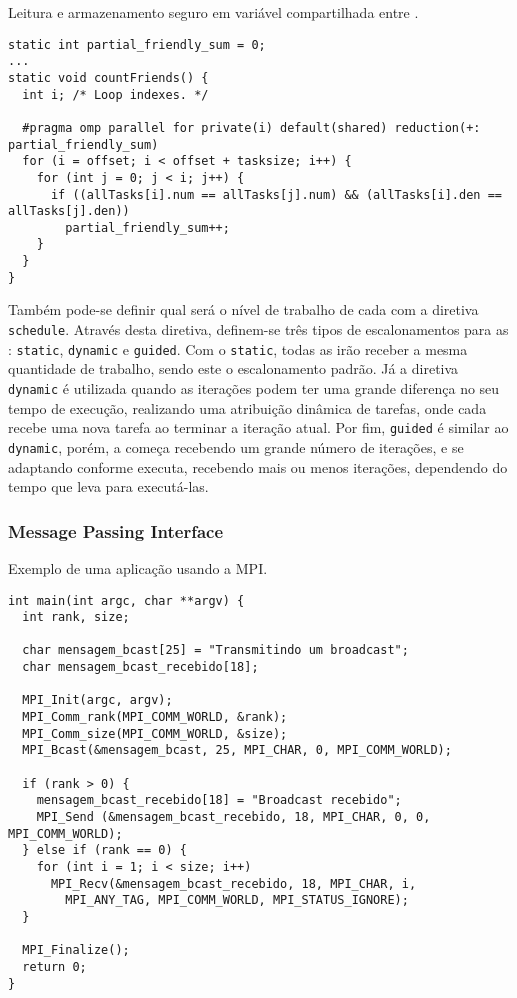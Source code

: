 \begin{listing}[tb]
\caption{Leitura e armazenamento seguro em variável compartilhada entre \threads.}
\label{lst:reductionloop}
\begin{verbatim}
static int partial_friendly_sum = 0;
...
static void countFriends() {
  int i; /* Loop indexes. */

  #pragma omp parallel for private(i) default(shared) reduction(+: partial_friendly_sum)
  for (i = offset; i < offset + tasksize; i++) {
    for (int j = 0; j < i; j++) {
      if ((allTasks[i].num == allTasks[j].num) && (allTasks[i].den == allTasks[j].den))
        partial_friendly_sum++;
    }
  }
}
\end{verbatim}
\end{listing}

Também pode-se definir qual será o nível de trabalho de cada \thread com a diretiva \texttt{schedule}. Através desta diretiva, definem-se três tipos de escalonamentos para as \threads: \texttt{static}, \texttt{dynamic} e \texttt{guided}. Com o \texttt{static}, todas as \threads irão receber a mesma quantidade de trabalho, sendo este o escalonamento padrão. Já a diretiva \texttt{dynamic} é utilizada quando as iterações podem ter uma grande diferença no seu tempo de execução, realizando uma atribuição dinâmica de tarefas, onde cada \thread recebe uma nova tarefa ao terminar a iteração atual. Por fim, \texttt{guided} é similar ao \texttt{dynamic}, porém, a \thread começa recebendo um grande número de iterações, e se adaptando conforme executa, recebendo mais ou menos iterações, dependendo do tempo que leva para executá-las.

\subsubsection{Message Passing Interface}
\label{sec:mpi}

\begin{listing}[tb]
\caption{Exemplo de uma aplicação usando a MPI.}
\label{lst:programmpi}
\begin{verbatim}
int main(int argc, char **argv) {
  int rank, size;

  char mensagem_bcast[25] = "Transmitindo um broadcast";
  char mensagem_bcast_recebido[18];

  MPI_Init(argc, argv);
  MPI_Comm_rank(MPI_COMM_WORLD, &rank);
  MPI_Comm_size(MPI_COMM_WORLD, &size);
  MPI_Bcast(&mensagem_bcast, 25, MPI_CHAR, 0, MPI_COMM_WORLD);

  if (rank > 0) {
    mensagem_bcast_recebido[18] = "Broadcast recebido";
    MPI_Send (&mensagem_bcast_recebido, 18, MPI_CHAR, 0, 0, MPI_COMM_WORLD);
  } else if (rank == 0) {
    for (int i = 1; i < size; i++)
      MPI_Recv(&mensagem_bcast_recebido, 18, MPI_CHAR, i, 
        MPI_ANY_TAG, MPI_COMM_WORLD, MPI_STATUS_IGNORE);
  }

  MPI_Finalize();
  return 0;
}
\end{verbatim}
\end{listing}

